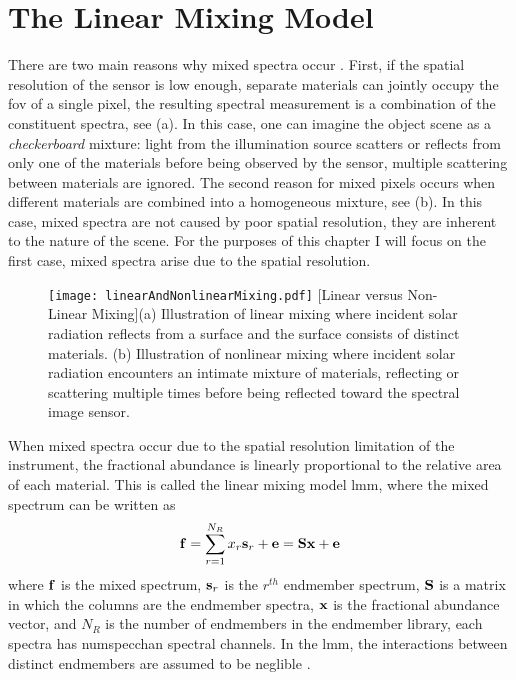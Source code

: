 \section{The Linear Mixing Model}

There are two main reasons why mixed spectra occur \cite{keshava2002spectral, keshava2003survey}. First, if the spatial resolution of the sensor is low enough, separate materials can jointly occupy the \acrfull{fov} of a single pixel, the resulting spectral measurement is a combination of the constituent spectra, see (a). In this case, one can imagine the object scene as a \emph{checkerboard} mixture: light from the illumination source scatters or reflects from only one of the materials before being observed by the sensor, multiple scattering between materials are ignored. The second reason for mixed pixels occurs when different materials are combined into a homogeneous mixture, see (b). In this case, mixed spectra are not caused by poor spatial resolution, they are inherent to the nature of the scene. For the purposes of this chapter I will focus on the first case, mixed spectra arise due to the spatial resolution. 

\begin{figure}
	\centering
	\texttt{[image: linearAndNonlinearMixing.pdf]}
	[Linear versus Non-Linear Mixing]{(a) Illustration of linear mixing where incident solar radiation reflects from a surface and the surface consists of distinct materials. (b) Illustration of nonlinear mixing where incident solar radiation encounters an intimate mixture of materials, reflecting or scattering multiple times before being reflected toward the spectral image sensor.}
	\label{fig:linearAndNonlinearMixing}
\end{figure}

When mixed spectra occur due to the spatial resolution limitation of the instrument, the fractional abundance is linearly proportional to the relative area of each material. This is called the linear mixing model \gls{lmm}, where the mixed spectrum can be written as 
%
\begin{equation}
\displaystyle \mathbf{f} = \sum_{r=1}^{N_{R}} x_r \displaystyle \mathbf{s}_r + \displaystyle \mathbf{e} = \displaystyle \mathbf{S} \displaystyle \mathbf{x}  + \displaystyle \mathbf{e}
\end{equation}
%
where $\displaystyle \mathbf{f}$ is the \gls{mixed spectrum}, $\displaystyle \mathbf{s}_r$ is the $r^{th}$ endmember spectrum, $\displaystyle \mathbf{S}$ is a matrix in which the columns are the endmember spectra, $\displaystyle \mathbf{x}$ is the fractional abundance vector, and $N_{R}$ is the number of endmembers in the endmember library, each spectra has \gls{numspecchan} spectral channels. In the \gls{lmm}, the interactions between distinct endmembers are assumed to be neglible \cite{clark1984reflectance}. 

